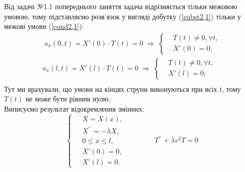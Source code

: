 Від задачі №1.1 попереднього заняття задача відрізняється тільки межовою умовою, тому підставляємо розв'язок у вигляді добутку (\ref{subst2,1}) тільки у межові умови (\ref{cond2,1}):
\begin{equation*}
    \begin{aligned}
        \;u_x(0,t) = X'(0) \cdot T(t) = 0
        \;\Rightarrow\;
        \left\{ \begin{aligned}
            &T(t) \neq 0, \forall t, \\  &X'(0) = 0; 
        \end{aligned} \right.\\
        u_x(l,t) = X'(l) \cdot T(t) = 0
        \;\Rightarrow\;
        \left\{ \begin{aligned}
            &T(t) \neq 0, \forall t, \\  &X'(l) = 0; 
        \end{aligned} \right.\\
    \end{aligned}
\end{equation*}
Тут ми врахували, що умови на кінцях струни виконуються при всіх $t$, тому $T(t)$ не може бути рівним нулю.\\

Виписуємо результат відокремлення змінних:
\begin{equation} \label{sepvar2,1}
    \left\{ \begin{aligned}
        \;&X = X(x), \\
          &X^{\prime\prime} = -\lambda X, \\
          &0 \leq x \leq l, \\
          &X'(0) = 0, \\ 
          &X'(l) = 0. 
    \end{aligned} \right.
    \qquad\qquad
    T^{\prime\prime} + \lambda v^2 T = 0
\end{equation}


